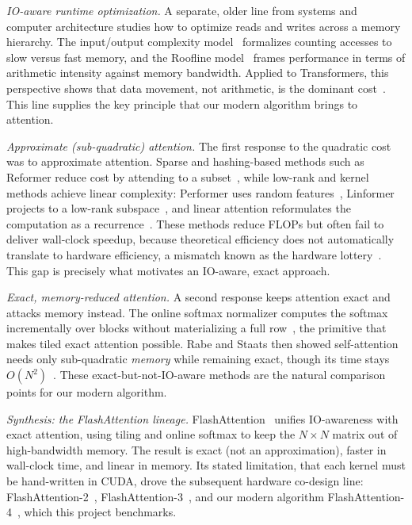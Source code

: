 \documentclass[sigconf,nonacm]{acmart}
\newcommand{\lead}[1]{\textit{#1}\quad}
\begin{document}
\lead{IO-aware runtime optimization.}
A separate, older line from systems and computer architecture studies how to
optimize reads and writes across a memory hierarchy. The input/output complexity
model~\cite{aggarwal1988io} formalizes counting accesses to slow versus fast
memory, and the Roofline model~\cite{williams2009roofline} frames performance in
terms of arithmetic intensity against memory bandwidth. Applied to Transformers,
this perspective shows that data movement, not arithmetic, is the dominant
cost~\cite{ivanov2021datamovement}. This line supplies the key principle that our
modern algorithm brings to attention.

\lead{Approximate (sub-quadratic) attention.}
The first response to the quadratic cost was to approximate attention. Sparse and
hashing-based methods such as Reformer reduce cost by attending to a
subset~\cite{kitaev2020reformer}, while low-rank and kernel methods achieve
linear complexity: Performer uses random features~\cite{choromanski2021performer},
Linformer projects to a low-rank subspace~\cite{wang2020linformer}, and linear
attention reformulates the computation as a recurrence~\cite{katharopoulos2020linear}.
These methods reduce FLOPs but often fail to deliver wall-clock speedup, because
theoretical efficiency does not automatically translate to hardware
efficiency, a mismatch known as the hardware
lottery~\cite{hooker2020hardwarelottery}. This gap is precisely what motivates an
IO-aware, exact approach.

\lead{Exact, memory-reduced attention.}
A second response keeps attention exact and attacks memory instead. The online
softmax normalizer computes the softmax incrementally over blocks without
materializing a full row~\cite{milakov2018online}, the primitive that makes
tiled exact attention possible. Rabe and Staats then showed self-attention needs
only sub-quadratic \emph{memory} while remaining exact, though its time stays
$O(N^2)$~\cite{rabe2021selfattention}. These exact-but-not-IO-aware methods are
the natural comparison points for our modern algorithm.

\lead{Synthesis: the FlashAttention lineage.}
FlashAttention~\cite{dao2022flashattention} unifies IO-awareness with exact
attention, using tiling and online softmax to keep the $N\times N$ matrix out of
high-bandwidth memory. The result is exact (not an approximation), faster in
wall-clock time, and linear in memory. Its stated limitation, that each kernel
must be hand-written in CUDA, drove the subsequent hardware co-design line:
FlashAttention-2~\cite{dao2023flashattention2},
FlashAttention-3~\cite{shah2024flashattention3}, and our modern algorithm
FlashAttention-4~\cite{zadouri2026flashattention4}, which this project
benchmarks.
\end{document}

